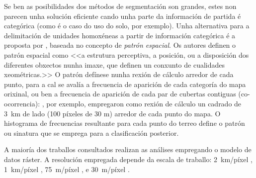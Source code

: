 \documentclass[11pt,a4paper]{article}
\begin{document}
Se ben as posibilidades dos métodos de segmentación son grandes, estes non parecen unha solución eficiente cando unha parte da información de partida é categórica (como é o caso do uso do solo, por exemplo). Unha alternativa para a delimitación de unidades homoxéneas a partir de información categórica é a proposta por \citet{Jasiewicz201562}, baseada no concepto de \emph{patrón espacial}. Os autores definen o patrón espacial como <<a estrutura perceptiva, a posición, ou a disposición dos diferentes obxectos nunha imaxe, que definen un conxunto de cualidades xeométricas.>> O patrón defínese nunha rexión de cálculo arredor de cada punto, para a cal se avalía a frecuencia de aparición de cada categoría do mapa orixinal, ou ben a frecuencia de aparición de cada par de cubertas contiguas (co-ocorrencia): \citet{Niesterowicz2013250}, por exemplo, empregaron como rexión de cálculo un cadrado de 3~km de lado (100 píxeles de 30 m) arredor de cada punto do mapa. O histograma de frecuencias resultante para cada punto do terreo define o patrón ou sinatura que se emprega para a clasificación posterior.

A maioría dos traballos consultados realizan as análises empregando o modelo de datos ráster. A resolución empregada depende da escala de traballo: 2~km/píxel \citep[sobre toda a República Checa]{Chuman2010200}, 1~km/píxel \citep[Unión Europea]{Mucher201087}, 75~m/píxel \citep[Italia]{Capotorti2012174}, e 30~m/píxel \citep[Polonia]{Jasiewicz2014104}.



\end{document}
